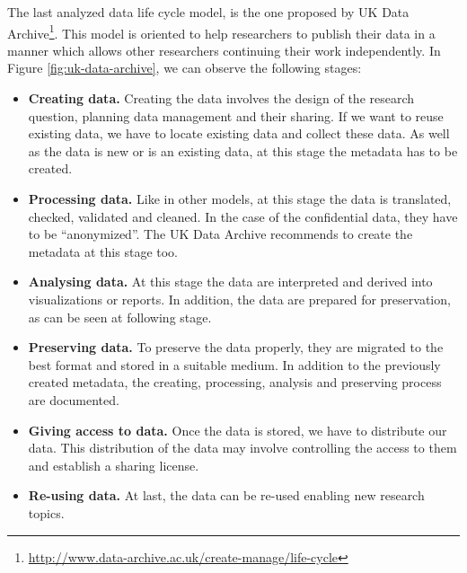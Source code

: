 The last analyzed data life cycle model, is the one proposed by UK Data Archive\footnote{\url{http://www.data-archive.ac.uk/create-manage/life-cycle}}. This model is oriented to help researchers to publish their data in a manner which allows other researchers continuing their work independently. In Figure \ref{fig:uk-data-archive}, we can observe the following stages:
\begin{itemize}
    \item \textbf{Creating data.} Creating the data involves the design of the research question, planning data management and their sharing. If we want to reuse existing data, we have to locate existing data and collect these data. As well as the data is new or is an existing data, at this stage the metadata has to be created.
    \item \textbf{Processing data.} Like in other models, at this stage the data is translated, checked, validated and cleaned. In the case of the confidential data, they have to be ``anonymized''. The UK Data Archive recommends to create the metadata at this stage too.
    \item \textbf{Analysing data.} At this stage the data are interpreted and derived into visualizations or reports. In addition, the data are prepared for preservation, as can be seen at following stage.
    \item \textbf{Preserving data.} To preserve the data properly, they are migrated to the best format and stored in a suitable medium. In addition to the previously created metadata, the creating, processing, analysis and preserving process are documented.
    \item \textbf{Giving access to data.} Once the data is stored, we have to distribute our data. This distribution of the data may involve controlling the access to them and establish a sharing license.
    \item \textbf{Re-using data.} At last, the data can be re-used enabling new research topics.
\end{itemize}

